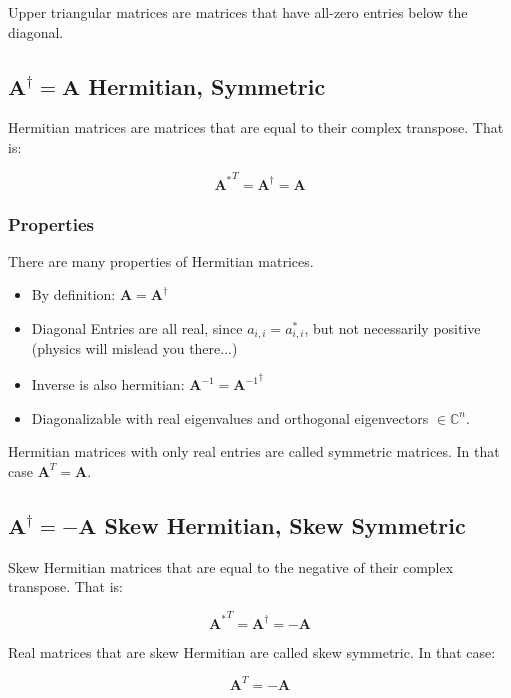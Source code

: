 Upper triangular matrices are matrices that have all-zero entries below the diagonal.


\subsection{$\mathbf{A}^{\dagger} = \mathbf{A}$ Hermitian, Symmetric}
Hermitian matrices are matrices that are equal to their complex transpose. That is:

\begin{equation}
{\mathbf{A}^{*}}^T = \mathbf{A}^\dagger = \mathbf{A} 
\end{equation}

\subsubsection{Properties}
There are many properties of Hermitian matrices. 
\begin{itemize}
\item By definition: $\mathbf{A} = \mathbf{A}^\dagger$
\item Diagonal Entries are all real, since $a_{i,i} = a_{i,i}^*$, but not necessarily positive (physics will mislead you there...)
\item Inverse is also hermitian:  $\mathbf{A}^{-1} ={ \mathbf{A}^{-1}}^\dagger$
\item Diagonalizable with real eigenvalues and orthogonal eigenvectors $\in \mathbb{C}^n$.
\end{itemize}


Hermitian matrices with only real entries are called symmetric matrices. In that case $\mathbf{A}^T = \mathbf{A}$.


\subsection{$\mathbf{A}^{\dagger} = -\mathbf{A}$ Skew Hermitian, Skew Symmetric}
Skew Hermitian matrices that are equal to the negative of their complex transpose. That is:

\begin{equation}
{\mathbf{A}^{*}}^T = \mathbf{A}^\dagger = -\mathbf{A} 
\end{equation}

Real matrices that are skew Hermitian are called skew symmetric. In that case:

\begin{equation}
\mathbf{A}^T = -\mathbf{A} 
\end{equation}


